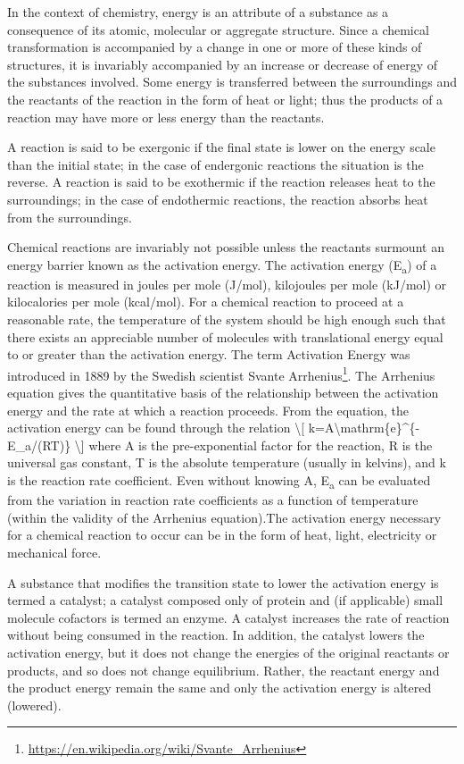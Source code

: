 \documentclass[
]{article}
\let\rmarkdownfootnote\footnote%
\def\footnote{\protect\rmarkdownfootnote}
\renewcommand{\href}[2]{#2\footnote{\url{#1}}}
\theoremstyle{definition}
\theoremstyle{definition}
\theoremstyle{definition}
\theoremstyle{remark}
\begin{document}
In the context of chemistry, energy is an attribute of a substance as a
consequence of its atomic, molecular or aggregate structure. Since a
chemical transformation is accompanied by a change in one or more of
these kinds of structures, it is invariably accompanied by an increase
or decrease of energy of the substances involved. Some energy is
transferred between the surroundings and the reactants of the reaction
in the form of heat or light; thus the products of a reaction may have
more or less energy than the reactants.

A reaction is said to be exergonic if the final state is lower on the
energy scale than the initial state; in the case of endergonic reactions
the situation is the reverse. A reaction is said to be exothermic if the
reaction releases heat to the surroundings; in the case of endothermic
reactions, the reaction absorbs heat from the surroundings.

Chemical reactions are invariably not possible unless the reactants
surmount an energy barrier known as the activation energy. The
activation energy (E\textsubscript{a}) of a reaction is measured in
joules per mole (J/mol), kilojoules per mole (kJ/mol) or kilocalories
per mole (kcal/mol). For a chemical reaction to proceed at a reasonable
rate, the temperature of the system should be high enough such that
there exists an appreciable number of molecules with translational
energy equal to or greater than the activation energy. The term
Activation Energy was introduced in 1889 by the Swedish scientist
\href{https://en.wikipedia.org/wiki/Svante_Arrhenius}{Svante Arrhenius}.
The Arrhenius equation gives the quantitative basis of the relationship
between the activation energy and the rate at which a reaction proceeds.
From the equation, the activation energy can be found through the
relation {\textbackslash{[}
k=A\textbackslash mathrm\{e\}\^{}\{-E\_a/(RT)\} \textbackslash{]}} where
A is the pre-exponential factor for the reaction, R is the universal gas
constant, T is the absolute temperature (usually in kelvins), and k is
the reaction rate coefficient. Even without knowing A,
E\textsubscript{a} can be evaluated from the variation in reaction rate
coefficients as a function of temperature (within the validity of the
Arrhenius equation).The activation energy necessary for a chemical
reaction to occur can be in the form of heat, light, electricity or
mechanical force.

A substance that modifies the transition state to lower the activation
energy is termed a catalyst; a catalyst composed only of protein and (if
applicable) small molecule cofactors is termed an enzyme. A catalyst
increases the rate of reaction without being consumed in the reaction.
In addition, the catalyst lowers the activation energy, but it does not
change the energies of the original reactants or products, and so does
not change equilibrium. Rather, the reactant energy and the product
energy remain the same and only the activation energy is altered
(lowered).
\end{document}
